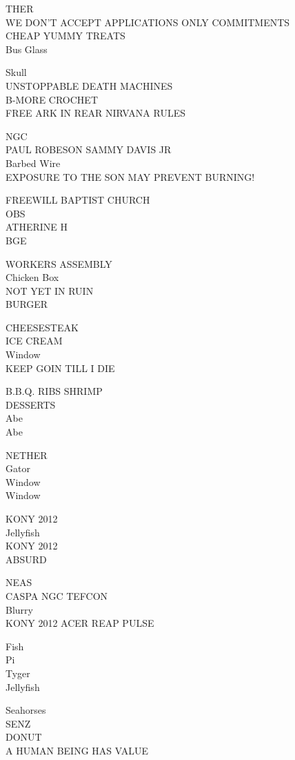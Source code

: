 \documentclass[10pt,letterpaper]{article}
\begin{document}
THER\\
WE DON'T ACCEPT APPLICATIONS ONLY COMMITMENTS\\
CHEAP YUMMY TREATS\\
Bus Glass

Skull\\
UNSTOPPABLE DEATH MACHINES\\
B{-}MORE CROCHET\\
FREE ARK IN REAR NIRVANA RULES

NGC\\
PAUL ROBESON SAMMY DAVIS JR\\
Barbed Wire\\
EXPOSURE TO THE SON MAY PREVENT BURNING!

FREEWILL BAPTIST CHURCH\\
OBS\\
ATHERINE H\\
BGE

WORKERS ASSEMBLY\\
Chicken Box\\
NOT YET IN RUIN\\
BURGER

CHEESESTEAK\\
ICE CREAM\\
Window\\
KEEP GOIN TILL I DIE

B.B.Q. RIBS SHRIMP\\
DESSERTS\\
Abe\\
Abe

NETHER\\
Gator\\
Window\\
Window

KONY 2012\\
Jellyfish\\
KONY 2012\\
ABSURD

NEAS\\
CASPA NGC TEFCON\\
Blurry\\
KONY 2012 ACER REAP PULSE

Fish\\
Pi\\
Tyger\\
Jellyfish

Seahorses\\
SENZ\\
DONUT\\
A HUMAN BEING HAS VALUE
\end{document}
